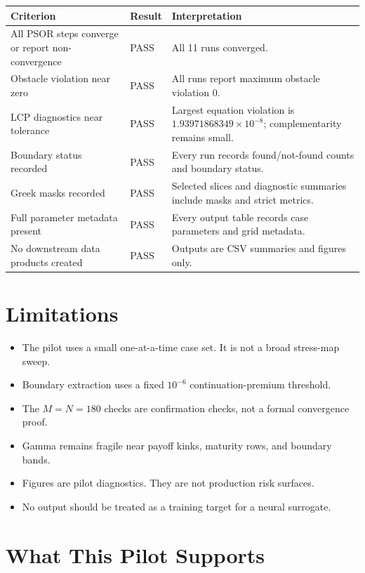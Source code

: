 \documentclass[11pt,a4paper]{article}
\begin{document}
\begin{longtable}{L{0.42\textwidth} L{0.18\textwidth} L{0.28\textwidth}}
\toprule
Criterion & Result & Interpretation \\
\midrule
\endhead
All PSOR steps converge or report non-convergence & PASS & All 11 runs converged. \\
Obstacle violation near zero & PASS & All runs report maximum obstacle violation \(0\). \\
LCP diagnostics near tolerance & PASS & Largest equation violation is \(1.93971868349\times10^{-8}\); complementarity remains small. \\
Boundary status recorded & PASS & Every run records found/not-found counts and boundary status. \\
Greek masks recorded & PASS & Selected slices and diagnostic summaries include masks and strict metrics. \\
Full parameter metadata present & PASS & Every output table records case parameters and grid metadata. \\
No downstream data products created & PASS & Outputs are CSV summaries and figures only. \\
\bottomrule
\end{longtable}

\section{Limitations}

\begin{itemize}
  \item The pilot uses a small one-at-a-time case set. It is not a broad stress-map sweep.
  \item Boundary extraction uses a fixed \(10^{-6}\) continuation-premium threshold.
  \item The \(M=N=180\) checks are confirmation checks, not a formal convergence proof.
  \item Gamma remains fragile near payoff kinks, maturity rows, and boundary bands.
  \item Figures are pilot diagnostics. They are not production risk surfaces.
  \item No output should be treated as a training target for a neural surrogate.
\end{itemize}

\section{What This Pilot Supports}
\end{document}
